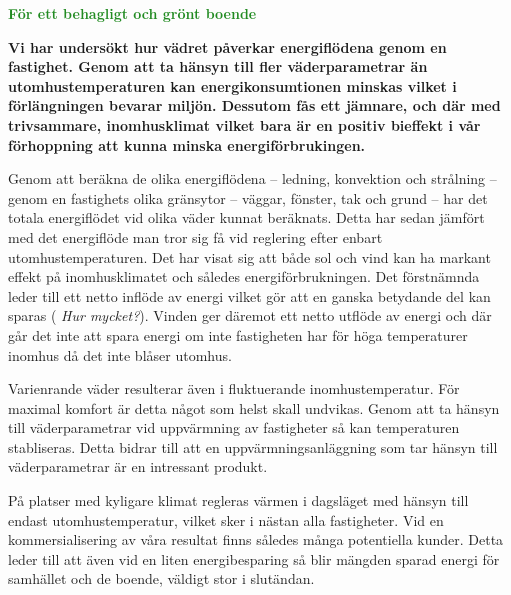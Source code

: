 \documentclass[11pt,a4paper]{article}
\begin{document}
\addtolength{\parindent}{-0.6 cm}
\pagestyle{fancy}
\rhead{\sc\footnotesize \today}
\mbox{}

\begin{center}
\textcolor{ForestGreen}{\textbf{\Huge För ett behagligt och grönt boende}}
\end{center}

\mbox{}

\setlength{\columnsep}{5mm}
\begin{multicols}{2}
\addtolength{\parskip}{1.3ex}
\linespread{1.02}
\normalsize



\textbf{Vi har undersökt hur vädret påverkar energiflödena genom en fastighet. Genom att ta hänsyn till fler väderparametrar än utomhustemperaturen kan energikonsumtionen minskas vilket i förlängningen bevarar miljön. Dessutom fås ett jämnare, och där med trivsammare, inomhusklimat vilket bara är en positiv bieffekt i vår förhoppning att kunna minska energiförbrukingen.}

Genom att beräkna de olika energiflödena – ledning, konvektion och strålning – genom en fastighets olika gränsytor – väggar, fönster, tak och grund – har det totala energiflödet vid olika väder kunnat beräknats. Detta har sedan jämfört med det energiflöde man tror sig få vid reglering efter enbart utomhustemperaturen. 
Det har visat sig att både sol och vind kan
ha markant effekt på inomhusklimatet och således energiförbrukningen. Det 
förstnämnda leder till ett netto inflöde av energi vilket gör att en ganska
betydande del kan sparas (\emph{\color{red} Hur mycket?}). Vinden
ger däremot ett netto utflöde av energi och där går det inte att spara energi
om inte fastigheten har för höga temperaturer inomhus då det inte blåser utomhus.

Varienrande väder resulterar även i fluktuerande inomhustemperatur. För maximal komfort är detta något som helst skall undvikas. Genom att ta hänsyn till väderparametrar vid uppvärmning av fastigheter så kan temperaturen stabliseras. Detta bidrar till att en uppvärmningsanläggning som tar hänsyn till väderparametrar är en intressant produkt.

På platser med kyligare klimat regleras värmen i dagsläget med hänsyn till endast utomhustemperatur,
vilket sker i nästan alla fastigheter. Vid en kommersialisering av våra
resultat finns således många potentiella kunder. Detta leder till att även vid en liten
energibesparing så blir mängden sparad energi för samhället och de boende, väldigt
stor i slutändan.



\end{multicols}
\end{document}
